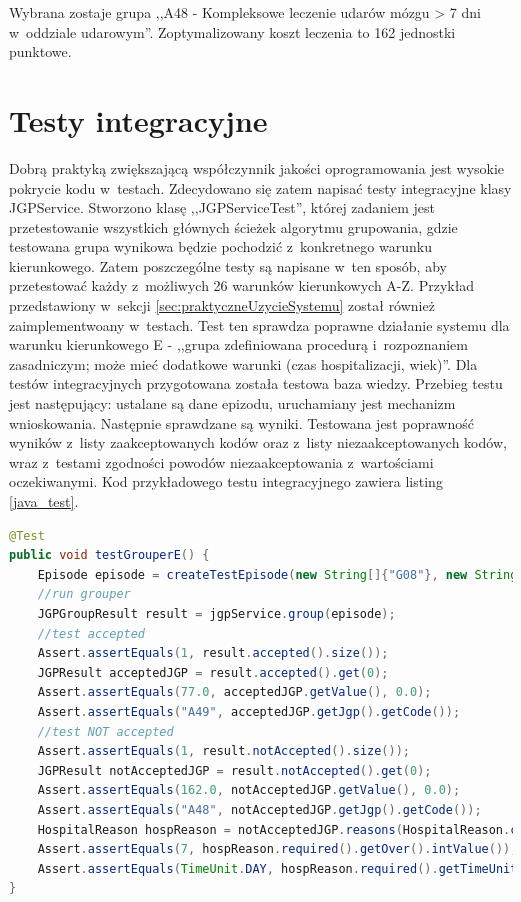 Wybrana zostaje grupa ,,A48 - Kompleksowe leczenie udarów mózgu > 7 dni w~oddziale udarowym''. Zoptymalizowany koszt leczenia to 162 jednostki punktowe.


\section{Testy integracyjne}
\label{sec:testyIntegracyjne}

Dobrą praktyką zwiększającą współczynnik jakości oprogramowania jest wysokie pokrycie kodu w~testach. Zdecydowano się zatem napisać testy integracyjne klasy JGPService. Stworzono klasę ,,JGPServiceTest'', której zadaniem jest przetestowanie wszystkich głównych ścieżek algorytmu grupowania, gdzie testowana grupa wynikowa będzie pochodzić z~konkretnego warunku kierunkowego. Zatem poszczególne testy są napisane w~ten sposób, aby przetestować każdy z~możliwych 26 warunków kierunkowych A-Z.
Przykład przedstawiony w~sekcji \ref{sec:praktyczneUzycieSystemu} został również zaimplementwoany w~testach. Test ten sprawdza poprawne działanie systemu dla warunku kierunkowego E - ,,grupa zdefiniowana procedurą i~rozpoznaniem zasadniczym; może mieć dodatkowe warunki (czas hospitalizacji, wiek)''.
Dla testów integracyjnych przygotowana została testowa baza wiedzy. Przebieg testu jest następujący: ustalane są dane epizodu, uruchamiany jest mechanizm wnioskowania. Następnie sprawdzane są wyniki. Testowana jest poprawność wyników z~listy zaakceptowanych kodów oraz z~listy niezaakceptowanych kodów, wraz z~testami zgodności powodów niezaakceptowania z~wartościami oczekiwanymi.
Kod przykładowego testu integracyjnego zawiera listing \ref{java_test}.

\newpage
\begin{lstlisting}[language=Java,caption={Test integracyjny sprawdzający warunek kierunkowy ,,E''.},label=java_test]
@Test
public void testGrouperE() {
    Episode episode = createTestEpisode(new String[]{"G08"}, new String[]{"88.714"}, 7, 75);
    //run grouper
    JGPGroupResult result = jgpService.group(episode);
    //test accepted
    Assert.assertEquals(1, result.accepted().size());
    JGPResult acceptedJGP = result.accepted().get(0);
    Assert.assertEquals(77.0, acceptedJGP.getValue(), 0.0);
    Assert.assertEquals("A49", acceptedJGP.getJgp().getCode());
    //test NOT accepted
    Assert.assertEquals(1, result.notAccepted().size());
    JGPResult notAcceptedJGP = result.notAccepted().get(0);
    Assert.assertEquals(162.0, notAcceptedJGP.getValue(), 0.0);
    Assert.assertEquals("A48", notAcceptedJGP.getJgp().getCode());
    HospitalReason hospReason = notAcceptedJGP.reasons(HospitalReason.class).get(0);
    Assert.assertEquals(7, hospReason.required().getOver().intValue());
    Assert.assertEquals(TimeUnit.DAY, hospReason.required().getTimeUnit());
}
\end{lstlisting}

